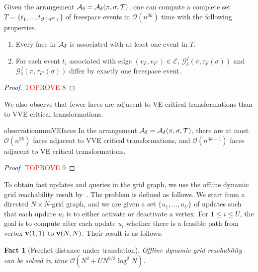 \documentclass[thm-restate]{lipics-v2021}
\newtheorem{fact}[theorem]{Fact}
\theoremstyle{remark}
\newcommand{\Oh}{\mathcal{O}}
\newcommand{\graph}[0]{\mathcal{G}}
\newcommand{\edges}[0]{\mathcal{E}}
\newcommand{\vertex}[1]{\normalfont \textbf{v}(#1)}
\newcommand{\fsgraph}[0]{\graph^{f}}
\newcommand{\trans}[0]{\mathcal{T}}
\begin{document}
\begin{lemma} \label{lem:events-from-arrangement}
    Given the arrangement $\arrangement = \arrangement(\pi, \sigma, \trans)$, one can compute a complete set $T = \{t_1, ..., t_{\Oh(n^{3k})}\}$ of freespace events in $\Oh(n^{3k})$ time with the following properties.
    \begin{enumerate}
        \item Every face in $\mathcal{A_\delta}$ is associated with at least one event in $T$. 
        \item For each event $t_i$ associated with edge $(v_F, v_{F'}) \in \edges$, $\fsgraph_\delta(\pi, \tau_F(\sigma))$ and $\fsgraph_\delta(\pi, \tau_{F'}(\sigma))$ differ by exactly one freespace event. 
    \end{enumerate}
\end{lemma}

\begin{proof}\textcolor{red}{TOPROVE 8}\end{proof}

We also observe that fewer faces are adjacent to VE critical transformations than to VVE critical transformations. 
\begin{restatable}{observation}{numVEfaces} \label{obs:number-vve-ve-faces}
    In the arrangement $\arrangement = \arrangement(\pi, \sigma, \trans)$, there are at most $\Oh(n^{3k})$ faces adjacent to VVE critical transformations, and $\Oh(n^{3k - 1})$ faces adjacent to VE critical transformations. 
\end{restatable}
\begin{proof}\textcolor{red}{TOPROVE 9}\end{proof}

To obtain fast updates and queries in the grid graph, we use the offline dynamic grid reachability result by~\cite{bringmannFrechetDistanceTranslation2021}. The problem is defined as follows. We start from a directed $N \times N$-grid graph, and we are given a set $\{u_1, ..., u_U\}$ of updates such that each update $u_i$ is to either activate or deactivate a vertex. For $1 \leq i \leq U$, the goal is to compute after each update $u_i$ whether there is a feasible path from vertex $\vertex{1, 1}$ to $\vertex{N, N}$. Their result is as follows. 
\begin{fact}[Frechet distance under translation{\cite[Theorem~3.4]{bringmannFrechetDistanceTranslation2021}}] \label{fac:bkn-ggraph-theorem}
    Offline dynamic grid reachability can be solved in time $\Oh(N^2 + U N^{2/3} \log^2 N)$. 
\end{fact}
\end{document}
